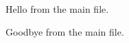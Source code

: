 \documentclass{article}
\begin{document}
Hello from the main file.

Goodbye from the main file.
\end{document}
